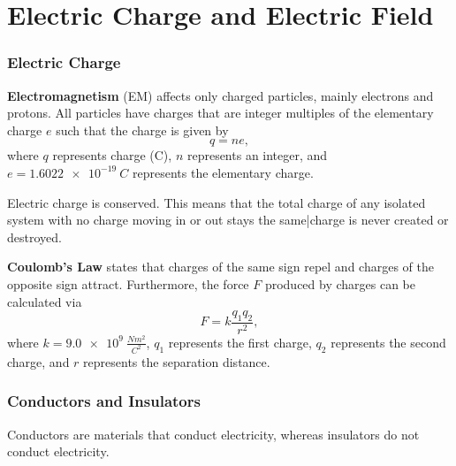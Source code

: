 \chapter{Electric Charge and Electric Field}

\subsection{Electric Charge}
\textbf{Electromagnetism} (EM) affects only charged particles, mainly electrons and protons. All particles have charges that are integer multiples of the elementary charge $e$ such that the charge is given by
\begin{equation}
q = ne,
\end{equation}
where $q$ represents charge (C), $n$ represents an integer, and $e = \SI{1.6022e-19}{C}$ represents the elementary charge.

Electric charge is conserved. This means that the total charge of any isolated system with no charge moving in or out stays the same|charge is never created or destroyed. 

\textbf{Coulomb's Law} states that charges of the same sign repel and charges of the opposite sign attract. Furthermore, the force $F$ produced by charges can be calculated via
\begin{equation}
F = k\frac{q_1q_2}{r^2},
\end{equation}
where $k = \SI{9.0e9}{\frac{N m^2}{C^2}}$, $q_1$ represents the first charge, $q_2$ represents the second charge, and $r$ represents the separation distance.

\subsection{Conductors and Insulators}
Conductors are materials that conduct electricity, whereas insulators do not conduct electricity. 

